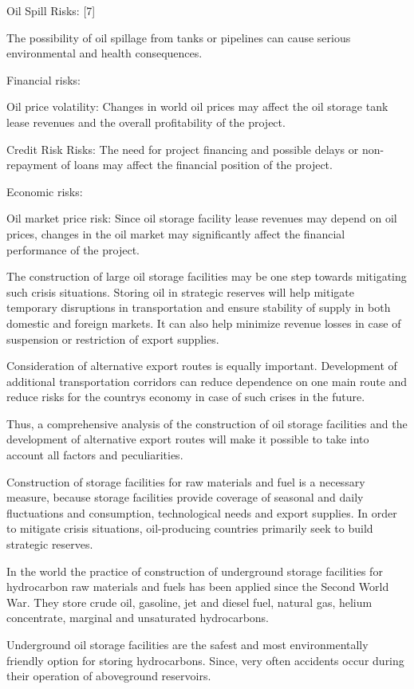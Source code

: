 Oil Spill Risks: {[}7{]}

The possibility of oil spillage from tanks or pipelines can cause
serious environmental and health consequences.

Financial risks:

Oil price volatility: Changes in world oil prices may affect the oil
storage tank lease revenues and the overall profitability of the
project.

Credit Risk Risks: The need for project financing and possible delays or
non-repayment of loans may affect the financial position of the project.

Economic risks:

Oil market price risk: Since oil storage facility lease revenues may
depend on oil prices, changes in the oil market may significantly affect
the financial performance of the project.

The construction of large oil storage facilities may be one step towards
mitigating such crisis situations. Storing oil in strategic reserves
will help mitigate temporary disruptions in transportation and ensure
stability of supply in both domestic and foreign markets. It can also
help minimize revenue losses in case of suspension or restriction of
export supplies.

Consideration of alternative export routes is equally important.
Development of additional transportation corridors can reduce dependence
on one main route and reduce risks for the country\textquotesingle s
economy in case of such crises in the future.

Thus, a comprehensive analysis of the construction of oil storage
facilities and the development of alternative export routes will make it
possible to take into account all factors and peculiarities.

Construction of storage facilities for raw materials and fuel is a
necessary measure, because storage facilities provide coverage of
seasonal and daily fluctuations and consumption, technological needs and
export supplies. In order to mitigate crisis situations, oil-producing
countries primarily seek to build strategic reserves.

In the world the practice of construction of underground storage
facilities for hydrocarbon raw materials and fuels has been applied
since the Second World War. They store crude oil, gasoline, jet and
diesel fuel, natural gas, helium concentrate, marginal and unsaturated
hydrocarbons.

Underground oil storage facilities are the safest and most
environmentally friendly option for storing hydrocarbons. Since, very
often accidents occur during their operation of aboveground reservoirs.

